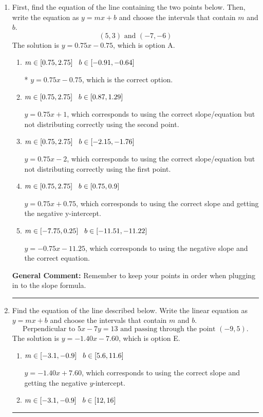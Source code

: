 \documentclass{extbook}[14pt]
\newcommand{\litem}[1]{\item #1

\rule{\textwidth}{0.4pt}}
\begin{document}
\begin{enumerate}\litem{
First, find the equation of the line containing the two points below. Then, write the equation as $ y=mx+b $ and choose the intervals that contain $m$ and $b$.
\[ (5, 3) \text{ and } (-7, -6) \]
The solution is \( y = 0.75x -0.75 \), which is option A.\begin{enumerate}[label=\Alph*.]
\item \( m \in [0.75, 2.75] \hspace*{3mm} b \in [-0.91, -0.64] \)

* $y = 0.75x -0.75$, which is the correct option.
\item \( m \in [0.75, 2.75] \hspace*{3mm} b \in [0.87, 1.29] \)

 $y = 0.75x + 1$, which corresponds to using the correct slope/equation but not distributing correctly using the second point.
\item \( m \in [0.75, 2.75] \hspace*{3mm} b \in [-2.15, -1.76] \)

 $y = 0.75x -2$, which corresponds to using the correct slope/equation but not distributing correctly using the first point.
\item \( m \in [0.75, 2.75] \hspace*{3mm} b \in [0.75, 0.9] \)

 $y = 0.75x + 0.75$, which corresponds to using the correct slope and getting the negative y-intercept.
\item \( m \in [-7.75, 0.25] \hspace*{3mm} b \in [-11.51, -11.22] \)

 $y = -0.75x -11.25$, which corresponds to using the negative slope and the correct equation.
\end{enumerate}

\textbf{General Comment:} Remember to keep your points in order when plugging in to the slope formula.
}
\litem{
Find the equation of the line described below. Write the linear equation as $ y=mx+b $ and choose the intervals that contain $m$ and $b$.
\[ \text{Perpendicular to } 5 x - 7 y = 13 \text{ and passing through the point } (-9, 5). \]
The solution is \( y = -1.40x - 7.60 \), which is option E.\begin{enumerate}[label=\Alph*.]
\item \( m \in [-3.1, -0.9] \hspace*{3mm} b \in [5.6, 11.6] \)

 $y = -1.40x + 7.60$, which corresponds to using the correct slope and getting the negative $y$-intercept.
\item \( m \in [-3.1, -0.9] \hspace*{3mm} b \in [12, 16] \)


\end{enumerate}}
\end{enumerate}
\end{document}
